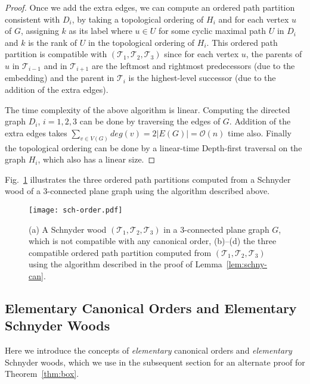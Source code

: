 \documentclass{article}
\newcommand{\TT}{{\mathcal{T}}}
\newcommand{\df}{\textit}
\newcommand{\Oh}{{\ensuremath{\mathcal{O}}}}
\begin{document}
\begin{proof}
Once we add the extra edges, we can compute an ordered path partition consistent with $D_i$, by taking a
 topological ordering of $H_i$ and for each vertex $u$ of $G$, assigning $k$ as its label
 where $u\in U$ for some cyclic maximal path $U$ in $D_i$ and $k$ is the rank of $U$ in the
 topological ordering of $H_i$. This ordered path partition is compatible with $(\TT_1, \TT_2, \TT_3)$ since
 for each vertex $u$, the parents of $u$ in $\TT_{i-1}$ and in $\TT_{i+1}$ are the leftmost and rightmost
 predecessors (due to the embedding) and the parent in $\TT_i$ is the highest-level successor
 (due to the addition of the extra edges).


The time complexity of the above algorithm is linear. Computing the directed graph $D_i$, $i=1,2,3$
 can be done by traversing the edges of $G$. Addition of the extra
 edges takes $\sum_{v\in V(G)}deg(v)=2|E(G)|=\Oh(n)$ time also. Finally the topological ordering can be
 done by a linear-time Depth-first traversal on the graph $H_i$, which also has a linear size.
\end{proof}




Fig.~\ref{fig:sch-order} illustrates the three ordered path partitions computed from a Schnyder wood of
 a $3$-connected plane graph using the algorithm described above.



\begin{figure}[htbp]
\centering
\texttt{[image: sch-order.pdf]}
\caption{(a) A Schnyder wood $(\TT_1, \TT_2, \TT_3)$ in a $3$-connected plane graph $G$, which is not
 compatible with any canonical order, (b)--(d) the three compatible ordered path partition computed from
 $(\TT_1, \TT_2, \TT_3)$ using the algorithm described in the proof of Lemma~\ref{lem:schny-can}.}
\label{fig:sch-order}
\end{figure}










\subsection{Elementary Canonical Orders and Elementary Schnyder Woods}


Here we introduce the concepts of \df{elementary} canonical orders and \df{elementary} Schnyder woods,
 which we use in the subsequent section for an alternate proof for Theorem~\ref{thm:box}.
\end{document}
